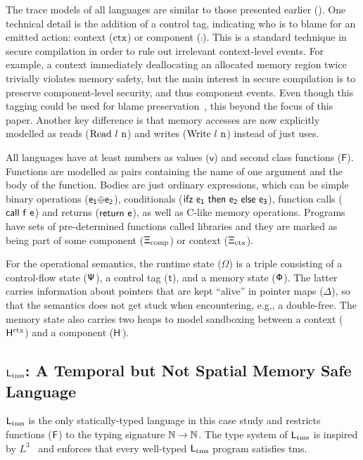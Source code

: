 \documentclass[dvipsnames,conference]{IEEEtran}
\theoremstyle{definition}
\begin{document}
{
  \renewcommand{\src}[1]{\mathsf{#1}}
The trace models of all languages are similar to those presented earlier ().
One technical detail is the addition of a control tag, indicating who is to blame for an emitted action: context ($\text{ctx}$) or component ($\comp$).
This is a standard technique in secure compilation in order to rule out irrelevant context-level events. 
For example, a context immediately deallocating an allocated memory region twice trivially violates memory safety, but the main interest in secure compilation is to preserve component-level security, and thus component events.
Even though this tagging could be used for blame preservation~\cite{patrignani2023blame}, this beyond the focus of this paper.
Another key difference is that memory accesses are now explicitly modelled as reads ($\src{\ev{Read\ \loc\ n}}$) and writes ($\src{\ev{Write\ \loc\ n}}$) instead of just uses.

All languages have at least numbers as values ($\src{v}$) and second class functions ($\src{F}$).
Functions are modelled as pairs containing the name of one argument and the body of the function.
Bodies are just ordinary expressions, which can be simple binary operations ($\src{\lbinop{\expr[_1]}{\expr[_2]}}$), conditionals ($\src{\lifz{\expr[_1]}{\expr[_2]}{\expr[_3]}}$), function calls ($\src{\lcall{f}{e}}$) and returns ($\src{\lreturn{\expr}}$), as well as C-like memory operations. 
Programs have sets of pre-determined functions called libraries and they are marked as being part of some component ($\src{\library_{\comp}}$) or context ($\src{\library_{\ctx}}$).

For the operational semantics, the runtime state ($\src{\Omega}$) is a triple consisting of a control-flow state ($\src{\cfstate}$), a control tag ($\src{\sandboxtag{}}$), and a memory state ($\src{\memstate}$). 
The latter carries information about pointers that are kept ``alive'' in pointer maps ($\src{\Delta}$), so that the semantics does not get stuck when encountering, e.g., a double-free.
The memory state also carries two heaps to model sandboxing between a context ($\src{H^{\ctx}}$) and a component ($\src{H^{\comp}}$).

}

\subsection{$\src{L_{\tmssafe}}$: A Temporal but Not Spatial Memory Safe Language}\label{subsec:ltms}

$\src{L_{\tmssafe}}$ is the only statically-typed language in this case study and restricts functions ($\src{F}$) to the typing signature $\src{\natt\to\natt}$. 
The type system of $\src{L_{\tmssafe}}$ is inspired by $L^{3}$~\cite{morrisett2005L3,scherer2018fabulous} and enforces that every well-typed $\src{L_{\tmssafe}}$ program satisfies \gls*{tms}.
\end{document}
